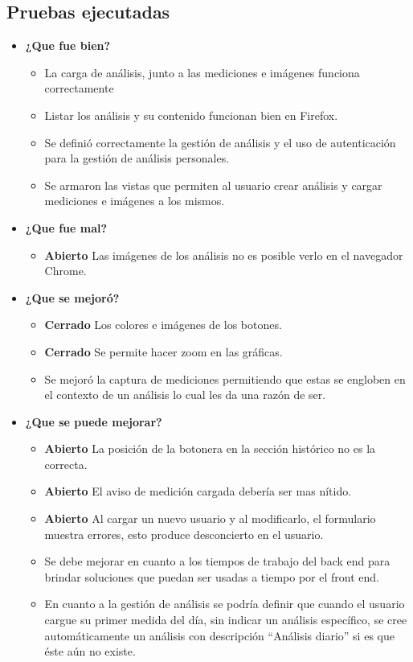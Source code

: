 \subsection{Pruebas ejecutadas}
	\begin{itemize}
		\item \textbf{¿Que fue bien?}
        	\begin{itemize}
				\item La carga de análisis, junto a las mediciones e imágenes funciona correctamente
				\item Listar los análisis y su contenido funcionan bien en Firefox.
				\item Se definió correctamente la gestión de análisis y el uso de autenticación para la gestión de análisis personales.
				\item Se armaron las vistas que permiten al usuario crear análisis y cargar mediciones e imágenes a los mismos.
			\end{itemize}
		\item \textbf{¿Que fue mal?}
		\begin{itemize}
			\item \textbf{Abierto} Las imágenes de los análisis no es posible verlo en el navegador Chrome.
			
		\end{itemize}
   		\item \textbf{¿Que se mejoró?}
        	\begin{itemize}
                \item \textbf{Cerrado} Los colores e imágenes de los botones.
                \item \textbf{Cerrado} Se permite hacer zoom en las gráficas.
                \item Se mejoró la captura de mediciones permitiendo que estas se engloben en el contexto de un análisis lo cual les da una razón de ser.
			\end{itemize}

   		\item \textbf{¿Que se puede mejorar?}
        	\begin{itemize}
		       \item \textbf{Abierto} La posición de la botonera en la sección histórico no es la correcta.
		       \item \textbf{Abierto}  El aviso de medición cargada debería ser mas nítido.
		       \item \textbf{Abierto} Al cargar un nuevo usuario y al modificarlo, el formulario muestra errores, esto produce desconcierto en el usuario.
		        \item Se debe mejorar en cuanto a los tiempos de trabajo del back end para brindar soluciones que puedan ser usadas a tiempo por el front end.
		        \item En cuanto a la gestión de análisis se podría definir que cuando el usuario cargue su primer medida del día, sin indicar un análisis específico, se cree automáticamente un análisis con descripción ``Análisis diario'' si es que éste aún no existe.
            \end{itemize}
        

	\end{itemize}